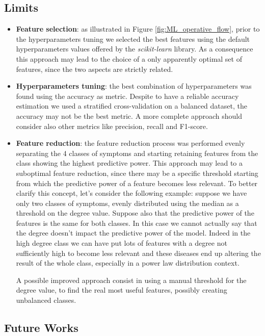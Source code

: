 \subsection{Limits}
\begin{itemize}
	\item \textbf{Feature selection}: as illustrated in Figure \ref{fig:ML_operative_flow}, prior to the hyperparameters tuning we selected the best
	features using the default hyperparameters values offered by the \textit{scikit-learn} library. As a consequence this approach may lead to the
	choice of a only apparently optimal set of features, since the two aspects are strictly related.

	\item \textbf{Hyperparameters tuning}: the best combination of hyperparameters was found using the accuracy as metric. Despite
	to have a reliable accuracy estimation we used a stratified cross-validation on a balanced dataset, the accuracy may not be the best metric.
	A more complete approach should consider also other metrics like precision, recall and F1-score. 
	
	\item \textbf{Feature reduction}: the feature reduction process was performed evenly separating the 4 classes of symptoms and starting
	retaining features from the class showing the highest predictive power. This approach may lead to a suboptimal feature reduction, since
	there may be a specific threshold starting from which the predictive power of a feature becomes less relevant.
	To better clarify this concept, let's consider the following example: suppose we have only two classes of symptoms, evenly distributed 
	using the median as a threshold on the degree value. Suppose also that the predictive power of the features is the same for both classes.
	In this case we cannot actually say that the degree doesn't impact the predictive power of the model. Indeed in the high degree class
	we can have put lots of features with a degree not sufficiently high to become less relevant and these diseases end up
	altering the result of the whole class, especially in a power law distribution context. 

	A possible improved approach consist in using a manual threshold for the degree value, to find the real most useful features, possibly creating
	unbalanced classes.
\end{itemize}

\subsection{Future Works}

